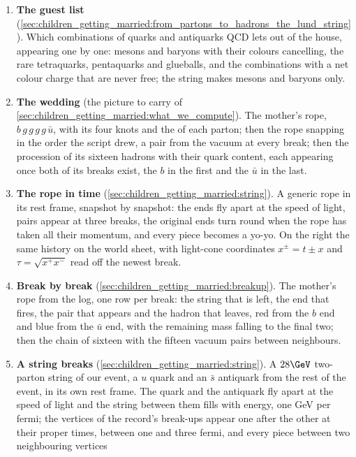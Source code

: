 \begin{enumerate}
  \item \textbf{The guest list} (\cref{sec:children_getting_married:from_partons_to_hadrons_the_lund_string}).
    Which combinations of quarks and antiquarks QCD lets out of the house,
    appearing one by one: mesons and baryons with their colours cancelling,
    the rare tetraquarks, pentaquarks and glueballs, and the combinations
    with a net colour charge that are never free; the string makes mesons
    and baryons only.
  \item \textbf{The wedding} (the picture to carry of
    \cref{sec:children_getting_married:what_we_compute}). The mother's
    rope, $b\,g\,g\,g\,g\,\bar u$, with its four knots and the \pt of
    each parton; then the rope snapping in the order the script drew, a
    pair from the vacuum at every break; then the procession of its
    sixteen hadrons with their quark content, each appearing once both of
    its breaks exist, the $b$ in the first and the $\bar u$ in the last.
  \item \textbf{The rope in time} (\cref{sec:children_getting_married:string}).
    A generic rope in its rest frame, snapshot by snapshot: the ends fly
    apart at the speed of light, pairs appear at three breaks, the
    original ends turn round when the rope has taken all their momentum,
    and every piece becomes a yo-yo. On the right the same history on the
    world sheet, with light-cone coordinates $x^\pm=t\pm x$ and
    $\tau=\sqrt{x^+x^-}$ read off the newest break.
  \item \textbf{Break by break} (\cref{sec:children_getting_married:breakup}).
    The mother's rope from the  log, one row per break: the
    string that is left, the end that fires, the pair that appears and the
    hadron that leaves, red from the $b$ end and blue from the $\bar u$
    end, with the remaining mass falling to the final two; then the chain
    of sixteen with the fifteen vacuum pairs between neighbours.
  \item \textbf{A string breaks} (\cref{sec:children_getting_married:string}).
    A $28\GeV$ two-parton string of our event, a $u$ quark and an $\bar s$
    antiquark from the rest of the event, in its own rest frame. The quark and the
    antiquark fly apart at the speed of light and the string between them
    fills with energy, one GeV per fermi; the vertices of the record's
    break-ups appear one after the other at their proper times, between
    one and three fermi, and every piece between two neighbouring vertices

\end{enumerate}
